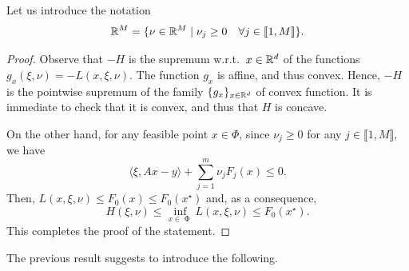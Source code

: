 \documentclass{report}
\DeclareMathOperator{\feas}{\Phi}
\begin{document}
Let us introduce the notation 
\begin{equation}
	\mathbb{R}^M=\{\nu\in \mathbb{R}^M\mid \nu_j\ge 0\quad \forall j\in \llbracket 1,M\rrbracket\}.
\end{equation}



\begin{proof}
	Observe that $-H$ is the supremum w.r.t.~$x\in \mathbb{R}^d$ of the functions $g_x(\xi,\nu) = -L(x,\xi,\nu)$. The function $g_x$ is affine, and thus convex. Hence, $-H$ is the pointwise supremum of the family $\{g_x\}_{x\in\mathbb{R}^d}$ of convex function. It is immediate to check that it is convex, and thus that $H$ is concave.

	On the other hand, for any feasible point $x\in \Phi$, since $\nu_j\ge 0$ for any $j\in \llbracket1,M\rrbracket$, we have 
	\begin{equation}
		\langle \xi, Ax-y\rangle +\sum_{j=1}^m \nu_j F_j(x) \le 0.
	\end{equation}
	Then, $L(x,\xi,\nu)\le F_0(x)\le F_0(x^\star)$ and, as a consequence,
	\begin{equation}
		H(\xi,\nu) \le \inf_{x\in\feas} L(x,\xi,\nu) \le F_0(x^\star).
	\end{equation}
	This completes the proof of the statement.
\end{proof}

The previous result suggests to introduce the following.
\end{document}
